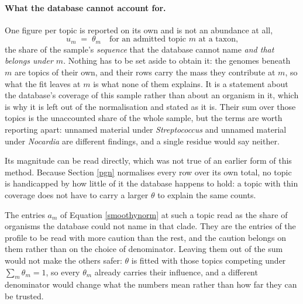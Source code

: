\documentclass[pdflatex,sn-vancouver-num]{sn-jnl}
\begin{document}
    \paragraph{What the database cannot account for.} One figure per topic is reported on its own and
    is not an abundance at all,
    \begin{equation}\label{smoothyunaccounted}
        u_m \;=\; \theta_m \quad\text{for an admitted topic } m \text{ at a taxon,}
    \end{equation}
    the share of the sample's \emph{sequence} that the database cannot name \emph{and that belongs
    under $m$}. Nothing has to be set aside to obtain it: the genomes beneath $m$ are topics of
    their own, and their rows carry the mass they contribute at $m$, so what the fit leaves at $m$ is
    what none of them explains. It is a statement about the database's coverage of this sample rather
    than about an organism in it, which is why it is left out of the normalisation and stated as it
    is. Their sum over those topics is the unaccounted share of the whole sample,
    but the terms are worth reporting apart:
    unnamed material under \emph{Streptococcus} and unnamed material under \emph{Nocardia} are
    different findings, and a single residue would say neither.

    Its magnitude can be read directly, which was not true of an earlier form of this method. Because
    Section \ref{pgn} normalises every row over its own total, no topic is handicapped by how little
    of it the database happens to hold: a topic with thin coverage does not have to carry a larger
    $\theta$ to explain the same counts.

    The entries $a_m$ of Equation \eqref{smoothynorm} at such a topic read as the share of organisms
    the database could not name in that clade. They are the entries of the profile to be read with more
    caution than the rest, and the caution belongs on them rather than on the choice of denominator.
    Leaving them out of the sum would not make the others safer: $\theta$ is fitted with those
    topics competing under $\sum_m \theta_m = 1$, so every $\theta_m$ already carries
    their influence, and a different denominator would change what the numbers mean rather than how
    far they can be trusted.
\end{document}
